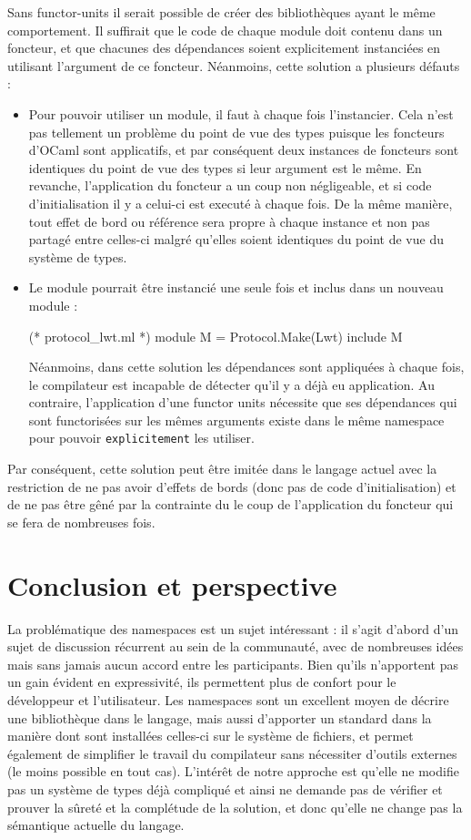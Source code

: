 \documentclass[11pt,a4paper]{report}
\begin{document}
Sans functor-units il serait possible de créer des bibliothèques ayant le même
comportement. Il suffirait que le code de chaque module doit contenu dans un
foncteur, et que chacunes des dépendances soient explicitement instanciées en
utilisant l'argument de ce foncteur. Néanmoins, cette solution a plusieurs
défauts :
\begin{itemize}
\item Pour pouvoir utiliser un module, il faut à chaque fois l'instancier. Cela
  n'est pas tellement un problème du point de vue des types puisque les
  foncteurs d'OCaml sont applicatifs, et par conséquent deux instances de
  foncteurs sont identiques du point de vue des types si leur argument est le
  même. En revanche, l'application du foncteur a un coup non négligeable, et si
  code d'initialisation il y a celui-ci est executé à chaque fois. De la même
  manière, tout effet de bord ou référence sera propre à chaque instance et non
  pas partagé entre celles-ci malgré qu'elles soient identiques du point de vue
  du système de types.
\item Le module pourrait être instancié une seule fois et inclus dans un nouveau
  module :
\begin{OCaml}
(* protocol_lwt.ml *)
module M = Protocol.Make(Lwt)
include M
\end{OCaml}
Néanmoins, dans cette solution les dépendances sont appliquées à chaque fois, le
compilateur est incapable de détecter qu'il y a déjà eu application. Au
contraire, l'application d'une functor units nécessite que ses dépendances qui
sont functorisées sur les mêmes arguments existe dans le même namespace pour
pouvoir \texttt{explicitement} les utiliser. 
\end{itemize}

Par conséquent, cette solution peut être imitée dans le langage actuel avec la
restriction de ne pas avoir d'effets de bords (donc pas de code
d'initialisation) et de ne pas être gêné par la contrainte du le coup de
l'application du foncteur qui se fera de nombreuses fois.

\chapter{Conclusion et perspective}

La problématique des namespaces est un sujet intéressant : il s'agit d'abord
d'un sujet de discussion récurrent au sein de la communauté, avec de nombreuses
idées mais sans jamais aucun accord entre les participants. Bien qu'ils n'apportent
pas un gain évident en expressivité, ils permettent plus de confort pour le
développeur et l'utilisateur. Les namespaces sont un excellent moyen de décrire
une bibliothèque dans le langage, mais aussi d'apporter un standard dans la
manière dont sont installées celles-ci sur le système de fichiers, et permet
également de simplifier le travail du compilateur sans nécessiter d'outils
externes (le moins possible en tout cas). L'intérêt de notre approche est
qu'elle ne modifie pas un système de types déjà compliqué et ainsi ne demande
pas de vérifier et prouver la sûreté et la complétude de la solution, et donc
qu'elle ne change pas la sémantique actuelle du langage.
\end{document}
